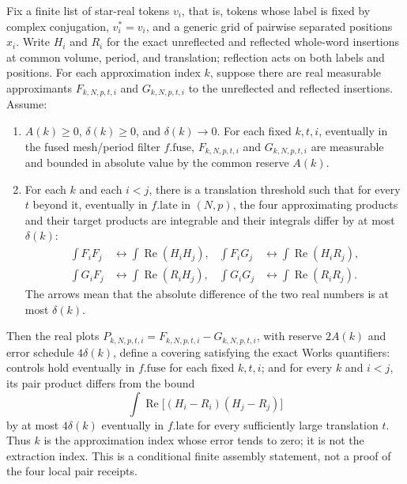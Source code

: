 \begin{theorem}
\label{thm:ex-public-grill}
Fix a finite list of star-real tokens $v_i$, that is, tokens whose label is
fixed by complex conjugation, $v_i^*=v_i$, and a generic grid of pairwise
separated positions $x_i$. Write
$H_i$ and $R_i$ for the exact unreflected and reflected whole-word insertions
at common volume, period, and translation; reflection acts on both labels
and positions. For each approximation index $k$, suppose there are real
measurable approximants $F_{k,N,p,t,i}$ and $G_{k,N,p,t,i}$ to the
unreflected and reflected insertions. Assume:
\begin{enumerate}
\item $A(k)\geq0$, $\delta(k)\geq0$, and $\delta(k)\to0$. For each fixed
      $k,t,i$, eventually in the fused mesh/period filter $f.\mathrm{fuse}$,
      $F_{k,N,p,t,i}$ and $G_{k,N,p,t,i}$ are measurable and bounded in
      absolute value by the common reserve $A(k)$.
\item For each $k$ and each $i<j$, there is a translation threshold such
      that for every $t$ beyond it, eventually in $f.\mathrm{late}$ in
      $(N,p)$, the four approximating products and their target products are
      integrable and their integrals differ by at most $\delta(k)$:
      \begin{align*}
       \int F_iF_j&\leftrightarrow\int\operatorname{Re}(H_iH_j),&
       \int F_iG_j&\leftrightarrow\int\operatorname{Re}(H_iR_j),\\
       \int G_iF_j&\leftrightarrow\int\operatorname{Re}(R_iH_j),&
       \int G_iG_j&\leftrightarrow\int\operatorname{Re}(R_iR_j).
      \end{align*}
      The arrows mean that the absolute difference of the two real numbers is
      at most $\delta(k)$.
\end{enumerate}
Then the real plots $P_{k,N,p,t,i}=F_{k,N,p,t,i}-G_{k,N,p,t,i}$,
with reserve $2A(k)$ and error schedule $4\delta(k)$, define a covering
satisfying the exact Works quantifiers: controls hold eventually in
$f.\mathrm{fuse}$ for each fixed $k,t,i$; and for every $k$ and $i<j$, its
pair product differs from the bound
\[
 \int\operatorname{Re}\bigl[(H_i-R_i)(H_j-R_j)\bigr]
\]
by at most $4\delta(k)$ eventually in $f.\mathrm{late}$ for every
sufficiently large translation $t$. Thus $k$ is the approximation index
whose error tends to zero; it is not the extraction index. This is a
conditional finite assembly statement, not a proof of the four local pair
receipts.
\end{theorem}

